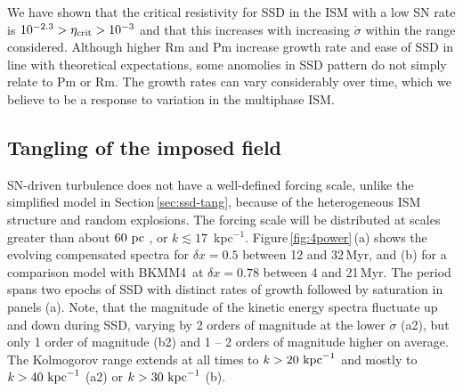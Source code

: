 \documentclass[preprint2]{aastex63}
\newcommand\kpc{~ {\rm kpc}}
\newcommand\pc{~ {\rm pc}}
\newcommand\dx{ {\delta x}}
\newcommand\BKM{{\sf BKMM4}}
\newcommand{\fg}[1]{\textcolor{midgreen}{#1}}
\begin{document}
 \fg{We have shown that the critical resistivity for SSD in the ISM with a
 low SN rate is $10^{-2.3}>\eta_{\rm crit}>10^{-3}$ and
 that this increases with increasing
 $\dot\sigma$ within the range considered.
 Although higher Rm and Pm increase growth rate and ease of SSD in
 line with theoretical expectations, some anomolies in SSD pattern
 do not simply relate to Pm or Rm.
 The growth rates can vary considerably over time, which we believe to be a 
 response to variation in the multiphase ISM.
 }
 
\subsection{\fg{Tangling of the imposed field}} \label{sec:Balsara}
  
 SN-driven turbulence does not have a well-defined forcing scale, unlike the
 simplified model in Section\,\ref{sec:ssd-tang}, because of the
 heterogeneous ISM structure and random explosions.
 The forcing scale will be distributed at scales greater than about $60\pc$
 \citep[][Table\,3]{HSSFG17}, or $k\lesssim17$~kpc$^{-1}$. 
 Figure\,\ref{fig:4power}\,(a) shows the evolving compensated spectra for 
 $\dx=0.5$ between \fg{12} and 32\,Myr\fg{, and (b) for a comparison model
 with \BKM\ at $\dx=0.78$ between 4 and 21\,Myr.}
 \fg{The period spans two epochs of SSD with distinct rates of growth 
 followed by saturation in panels (a).
 Note, that the magnitude of the kinetic energy spectra fluctuate up and down
 during SSD, varying by 2 orders of magnitude at the lower $\dot\sigma$ (a2),
 but only 1 order of magnitude (b2) and 1 -- 2 orders of magnitude higher
 on average.} 
 The Kolmogorov range extends at all times to $k>20\kpc^{-1}$ and mostly 
 to $k>40\kpc^{-1}$ (a2) or $k>30\kpc^{-1}$ (b). 
\end{document}
